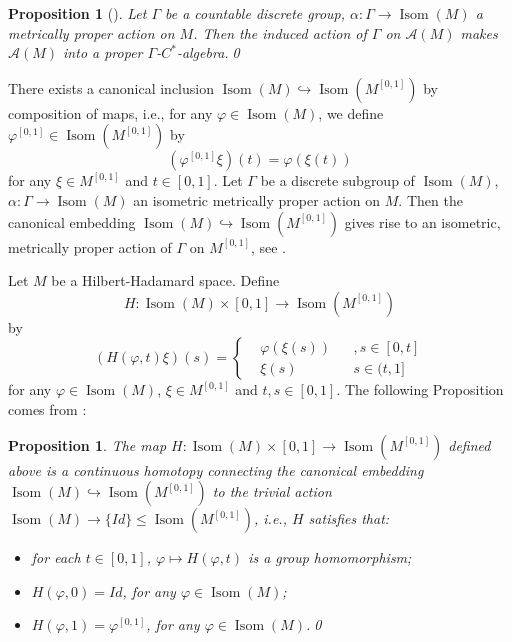 \documentclass[11pt]{article}
\theoremstyle{definition}
\theoremstyle{plain}
\newtheorem{Pro}[Def]{Proposition}
\def\A{\mathcal A}\def\C{\mathcal C}\def\B{\mathcal B}\def\E{\mathcal E}\def\O{\mathcal O}\def\h{\mathfrak h}\def\K{\mathcal K}\def\F{\mathcal F}\def\P{\mathcal P}\def\L{\mathcal L}\def\R{\mathcal R}\def\Q{\mathcal Q}\def\H{\mathcal H}\def\S{\mathcal S}\def\N{\mathcal N}\def\U{\mathcal U}\def\V{\mathcal V}
\def\Ga{\Gamma}
\begin{document}
\begin{Pro}[\cite{GWY2018}]
Let $\Ga$ be a countable discrete group, $\alpha:\Ga\to \operatorname{Isom}(M)$ a metrically proper action on $M$. Then the induced action of $\Ga$ on $\A(M)$ makes $\A(M)$ into a proper $\Ga$-$C^*$-algebra.\qed
\end{Pro}

There exists a canonical inclusion $\operatorname{Isom}(M)\hookrightarrow \operatorname{Isom}(M^{[0,1]})$ by composition of maps, i.e., for any $\varphi\in \operatorname{Isom}(M)$, we define $\varphi^{[0,1]}\in \operatorname{Isom}(M^{[0,1]})$ by
$$(\varphi^{[0,1]}\xi)(t)=\varphi(\xi(t))$$
for any $\xi\in M^{[0,1]}$ and $t\in[0,1]$. Let $\Ga$ be a discrete subgroup of $\operatorname{Isom}(M)$, $\alpha:\Ga\to \operatorname{Isom}(M)$ an isometric metrically proper action on $M$. Then the canonical embedding $\operatorname{Isom}(M)\hookrightarrow \operatorname{Isom}(M^{[0,1]})$ gives rise to an isometric, metrically proper action of $\Ga$ on $M^{[0,1]}$, see \cite[Proposition 3.19]{GWY2018}.

Let $M$ be a Hilbert-Hadamard space. Define
$$H:\operatorname{Isom}(M)\times [0,1]\to \operatorname{Isom}(M^{[0,1]})$$
by
\begin{equation}\label{eqH}
(H(\varphi,t)\xi)(s)=\left\{\begin{aligned}&\varphi(\xi(s))&&,s\in[0,t]\\&\xi(s)&&s\in(t,1]\end{aligned}\right.
\end{equation}
for any $\varphi\in \operatorname{Isom}(M)$, $\xi\in M^{[0,1]}$ and $t,s\in[0,1]$. The following Proposition comes from \cite[Proposition 3.18]{GWY2018}:

\begin{Pro}\label{H-homotopy}
The map $H: \operatorname{Isom}(M)\times [0,1]\to \operatorname{Isom}(M^{[0,1]})$ defined above is a continuous homotopy connecting the canonical embedding $\operatorname{Isom}(M)\hookrightarrow \operatorname{Isom}(M^{[0,1]})$ to the trivial action $\operatorname{Isom}(M)\to\{Id\}\leq \operatorname{Isom}(M^{[0,1]})$, i.e., $H$ satisfies that:
\begin{itemize}
\item[(1)]for each $t\in[0,1]$, $\varphi\mapsto H(\varphi,t)$ is a group homomorphism;
\item[(2)]$H(\varphi,0)=Id$, for any $\varphi\in \operatorname{Isom}(M)$;
\item[(3)]$H(\varphi,1)=\varphi^{[0,1]}$, for any $\varphi\in \operatorname{Isom}(M)$.\qed
\end{itemize}\end{Pro}
\end{document}
